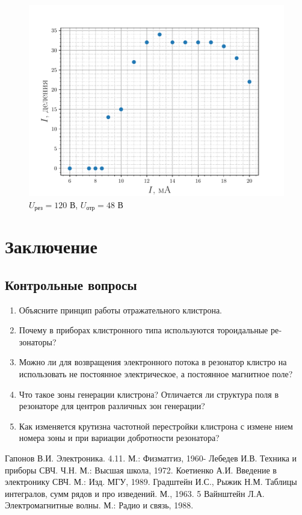 \begin{figure}[H]
		\centering
		\includegraphics[height=0.4\textheight]{fig/res120Vref48V.pdf}
		\caption{$U_{\text{рез}}=120$ В, $U_{\text{отр}}=48$ В}
		\label{fig:res120Vref48V}
\end{figure}

\section{Заключение}
\subsection{Контрольные вопросы}

\begin{enumerate}
	\item Объясните принцип работы отражательного клистрона.
	\item Почему в приборах клистронного типа используются тороидальные ре­
	зонаторы?
	\item Можно ли для возвращения электронного потока в резонатор клистро­
	на использовать не постоянное электрическое, а постоянное магнитное поле?
	\item Что такое зоны генерации клистрона? Отличается ли структура поля
	в резонаторе для центров различных зон генерации?
	\item Как изменяется крутизна частотной перестройки клистрона с измене­
	нием номера зоны и при вариации добротности резонатора?
\end{enumerate}

\begin{thebibliography}{}
	  Гапонов В.И. Электроника. 4.11. М.: Физматгиз, 1960-
	  Лебедев И.В. Техника и приборы СВЧ. Ч.Н. М.: Высшая школа, 1972.
	  Коетиенко А.И. Введение в электронику СВЧ. М.: Изд. МГУ, 1989.
	  Градштейн И.С., Рыжик Н.М. Таблицы интегралов, сумм рядов и про­
	изведений. М., 1963. 5
	  Вайнштейн Л.А. Электромагнитные волны. М.: Радио и связь, 1988.
\end{thebibliography}
